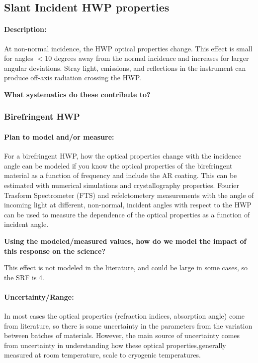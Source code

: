 \subsection{Slant Incident HWP properties}

\paragraph{Description:}
At non-normal incidence, the HWP optical properties change. This effect is small for angles $<$10 degrees away from the normal incidence and increases for larger angular deviations. Stray light, emissions, and reflections in the instrument can produce off-axis radiation crossing the HWP.

\textbf{What systematics do these contribute to?}

\subsubsection{Birefringent HWP}

\paragraph{Plan to model and/or measure:}
For a birefringent HWP, how the optical properties change with the incidence angle can be modeled if you know the optical properties of the birefringent material as a function of frequency and include the AR coating. This can be estimated with numerical simulations and crystallography properties. Fourier Trasform Spectrometer (FTS) and refelctometery measurements with the angle of incoming light at different, non-normal, incident angles with respect to the HWP can be used to measure the dependence of the optical properties as a function of incident angle.

\textbf{Using the modeled/measured values, how do we model the impact of this response on the science?}

This effect is not modeled in the literature, and could be large in some cases, so the SRF is 4.

\paragraph{Uncertainty/Range:}
In most cases the optical properties (refraction indices, absorption angle) come from literature, so there is some uncertainty in the parameters from the variation between batches of materials. However, the main source of uncertainty comes from uncertainty in understanding how these optical properties,generally measured at room temperature, scale to cryogenic temperatures.

